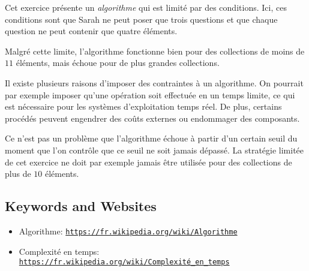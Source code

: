 \documentclass[a4paper,11pt]{report}
\newcommand{\BrochureUrlText}[1]{\texttt{#1}}
\begin{document}
Cet exercice présente un \emph{algorithme} qui est limité par des conditions. Ici, ces conditions sont que Sarah ne peut poser que trois questions et que chaque question ne peut contenir que quatre éléments.

Malgré cette limite, l’algorithme fonctionne bien pour des collections de moins de $11$ éléments, mais échoue pour de plus grandes collections.

Il existe plusieurs raisons d’imposer des contraintes à un algorithme. On pourrait par exemple imposer qu’une opération soit effectuée en un temps limite, ce qui est nécessaire pour les systèmes d’exploitation temps réel. De plus, certains procédés peuvent engendrer des coûts externes ou endommager des composants.

Ce n’est pas un problème que l’algorithme échoue à partir d’un certain seuil du moment que l’on contrôle que ce seuil ne soit jamais dépassé. La stratégie limitée de cet exercice ne doit par exemple jamais être utilisée pour des collections de plus de $10$ éléments.

{\raggedright

\subsection*{Keywords and Websites}

\begin{itemize}
  \item Algorithme: \href{https://fr.wikipedia.org/wiki/Algorithme}{\BrochureUrlText{https://fr.wikipedia.org/wiki/Algorithme}}
  \item Complexité en temps: \href{https://fr.wikipedia.org/wiki/Complexit\%C3\%A9_en_temps}{\BrochureUrlText{https://fr.wikipedia.org/wiki/Complexité\_en\_temps}}
\end{itemize}


}
\end{document}
